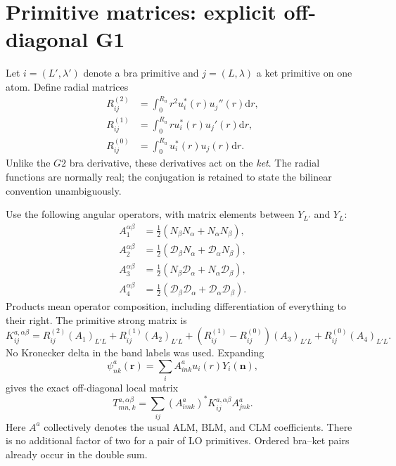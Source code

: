 \documentclass[11pt]{article}
\newcommand{\dd}{\mathrm d}
\begin{document}
\section{Primitive matrices: explicit off-diagonal G1}
Let $i=(L',\lambda')$ denote a bra primitive and $j=(L,\lambda)$ a ket primitive on one atom. Define radial matrices
\begin{align}
 R^{(2)}_{ij}&=\int_0^{R_a}r^2 u_i^*(r)u_j''(r)\dd r,\\
 R^{(1)}_{ij}&=\int_0^{R_a}r u_i^*(r)u_j'(r)\dd r,\\
 R^{(0)}_{ij}&=\int_0^{R_a}u_i^*(r)u_j(r)\dd r.
\end{align}
Unlike the $G2$ bra derivative, these derivatives act on the \emph{ket}. The radial functions are normally real; the conjugation is retained to state the bilinear convention unambiguously.

Use the following angular operators, with matrix elements between $Y_{L'}$ and $Y_L$:
\begin{align}
 A_1^{\alpha\beta}&=\tfrac12(N_\beta N_\alpha+N_\alpha N_\beta),\\
 A_2^{\alpha\beta}&=\tfrac12(\mathcal D_\beta N_\alpha+\mathcal D_\alpha N_\beta),\\
 A_3^{\alpha\beta}&=\tfrac12(N_\beta\mathcal D_\alpha+N_\alpha\mathcal D_\beta),\\
 A_4^{\alpha\beta}&=\tfrac12(\mathcal D_\beta\mathcal D_\alpha+\mathcal D_\alpha\mathcal D_\beta).
\end{align}
Products mean operator composition, including differentiation of everything to their right. The primitive strong matrix is
\begin{equation}\label{eq:primitive}
 \boxed{K^{a,\alpha\beta}_{ij}=R^{(2)}_{ij}(A_1)_{L'L}
 +R^{(1)}_{ij}(A_2)_{L'L}
 +(R^{(1)}_{ij}-R^{(0)}_{ij})(A_3)_{L'L}
 +R^{(0)}_{ij}(A_4)_{L'L}.}
\end{equation}
No Kronecker delta in the band labels was used. Expanding
\begin{equation}
 \psi_{nk}^{a}(\bm r)=\sum_i A^a_{in k}u_i(r)Y_i(\bm n),
\end{equation}
gives the exact off-diagonal local matrix
\begin{equation}\label{eq:offdiag}
 T^{a,\alpha\beta}_{mn,k}=\sum_{ij}(A^a_{im k})^*K^{a,\alpha\beta}_{ij}A^a_{jn k}.
\end{equation}
Here $A^a$ collectively denotes the usual ALM, BLM, and CLM coefficients. There is no additional factor of two for a pair of LO primitives. Ordered bra--ket pairs already occur in the double sum.
\end{document}
